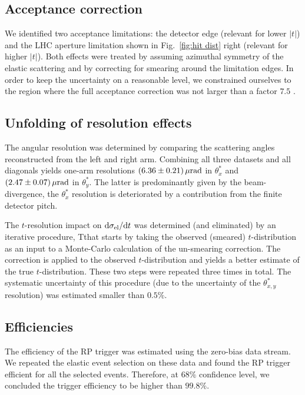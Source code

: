 \documentclass[doublecol]{../macros/epl2}
\def\d{{\rm d}}
\def\un#1{\,{\rm #1}}
\begin{document}
\subsection{Acceptance correction}

We identified two acceptance limitations: the detector edge (relevant for lower $|t|$) and the LHC aperture limitation shown in Fig.~\ref{fig:hit dist} right (relevant for higher $|t|$). Both effects were treated by assuming azimuthal symmetry of the elastic scattering and by correcting for smearing around the limitation edges. In order to keep the uncertainty on a reasonable level, we constrained ourselves to the region where the full acceptance correction was not larger than a factor $7.5$%
.


\subsection{Unfolding of resolution effects}

The angular resolution was determined by comparing the scattering angles reconstructed from the left and right arm. Combining all three datasets and all diagonals yields one-arm resolutions $(6.36\pm 0.21)\un{\mu rad}$ in $\theta^*_x$ and $(2.47\pm 0.07)\un{\mu rad}$ in $\theta^*_y$. The latter is predominantly given by the beam-divergence, the $\theta^*_x$ resolution is deteriorated by a contribution from the finite detector pitch.

The $t$-resolution impact on $\d\sigma_{\rm el}/\d t$  was determined (and eliminated) by an iterative procedure, Tthat starts by taking the observed (smeared) $t$-distribution as an input to a Monte-Carlo calculation of the un-smearing correction. The correction is applied to the observed $t$-distribution and yields a better estimate of the true $t$-distribution. These two steps were repeated three times in total. The systematic uncertainty of this procedure (due to the uncertainty of the $\theta^*_{x, y}$ resolution) was estimated smaller than $0.5\%$.

\subsection{Efficiencies}

The efficiency of the RP trigger was estimated using the zero-bias data stream. We repeated the elastic event selection on these data and found the RP trigger efficient for all the selected events. Therefore, at $68\%$ confidence level, we concluded the trigger efficiency to be higher than $99.8\%$.
\end{document}
